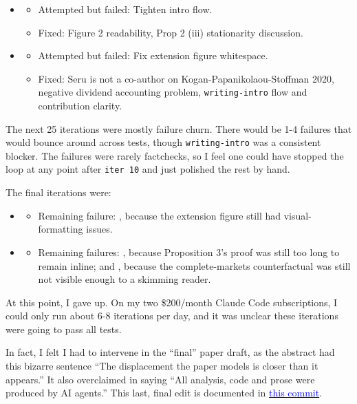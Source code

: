 \begin{itemize}
\item {}
\begin{itemize}
\item Attempted but failed: Tighten intro flow.
\item Fixed: Figure 2 readability, Prop 2 (iii) stationarity discussion.
\end{itemize}

\item {}
\begin{itemize}
\item Attempted but failed: Fix extension figure whitespace.
\item Fixed: Seru is not a co-author on Kogan-Papanikolaou-Stoffman 2020, negative dividend accounting problem, \texttt{writing-intro} flow and contribution clarity.
\end{itemize}
\end{itemize}

The next 25 iterations were mostly failure churn. There would be 1-4 failures that would bounce around across tests, though \texttt{writing-intro} was a consistent blocker. The failures were rarely factchecks, so I feel one could have stopped the loop at any point after \texttt{iter 10} and just polished the rest by hand.

The final iterations were:

\begin{itemize}
\item {}
\begin{itemize}
\item Remaining failure: , because the extension figure still had visual-formatting issues.
\end{itemize}

\item {}
\begin{itemize}
\item Remaining failures: , because Proposition 3's proof was still too long to remain inline; and , because the complete-markets counterfactual was still not visible enough to a skimming reader.
\end{itemize}
\end{itemize}

At this point, I gave up. On my two \$200/month Claude Code subscriptions, I could only run about 6-8 iterations per day, and it was unclear these iterations were going to pass all tests. 

In fact, I felt I had to intervene in the ``final'' paper draft, as the abstract had this bizarre sentence ``The displacement the paper models is closer than it appears.'' It also overclaimed in saying ``All analysis, code and prose were produced by AI agents.'' This last, final edit is documented in \href{https://github.com/chenandrewy/ralph-wiggum-asset-pricing/commit/4bed451b406d6c1190ef42e33517946c980d822d}{\textcolor{blue}{this commit}}.
